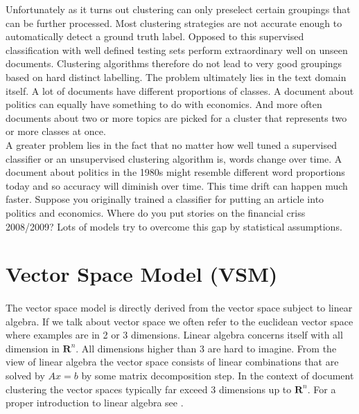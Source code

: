     Unfortunately as it turns out clustering can only preselect certain groupings that can be further processed. Most clustering strategies are not accurate enough to automatically detect a ground truth label. Opposed to this supervised classification with well defined testing sets perform extraordinary well on unseen documents. Clustering algorithms therefore do not lead to very good groupings based on hard distinct labelling. The problem ultimately lies in the text domain itself. A lot of documents have different proportions of classes. A document about politics can equally have something to do with economics. And more often documents about two or more topics are picked for a cluster that represents two or more classes at once. \cite{Nothing} \\
    A greater problem lies in the fact that no matter how well tuned a supervised classifier or an unsupervised clustering algorithm is, words change over time. A document about politics in the 1980s might resemble different word proportions today and so accuracy will diminish over time. This time drift can happen much faster. Suppose you originally trained a classifier for putting an article into politics and economics. Where do you put stories on the financial criss 2008/2009? Lots of models try to overcome this gap by statistical assumptions.

\newpage{}
\section{Vector Space Model (VSM)}
  
  \paragraph{}
    The vector space model is directly derived from the vector space subject to linear algebra. If we talk about vector space we often refer to the euclidean vector space where examples are in 2 or 3 dimensions. Linear algebra concerns itself with all dimension in $\mathbf{R}^{n}$. All dimensions higher than 3 are hard to imagine. From the view of linear algebra the vector space consists of linear combinations that are solved by $Ax = b$ by some matrix decomposition step. In the context of document clustering the vector spaces typically far exceed 3 dimensions up to $\mathbf{R}^{n}$. For a proper introduction to linear algebra see \cite{Strang2009}.

